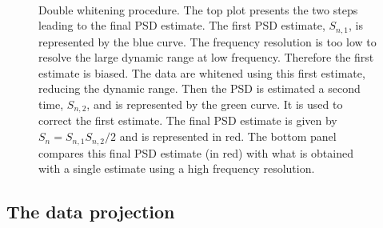 \begin{figure}
  \center
   \\
  \caption{Double whitening procedure. The top plot presents the two steps leading to the final PSD estimate. The first PSD estimate, $S_{n,1}$, is represented by the blue curve. The frequency resolution is too low to resolve the large dynamic range at low frequency. Therefore the first estimate is biased. The data are whitened using this first estimate, reducing the dynamic range. Then the PSD is estimated a second time, $S_{n,2}$, and is represented by the green curve. It is used to correct the first estimate. The final PSD estimate is given by $S_n=S_{n,1}S_{n,2}/2$ and is represented in red. The bottom panel compares this final PSD estimate (in red) with what is obtained with a single estimate using a high frequency resolution.}
  \label{fig:doublewhite}
\end{figure}



\subsection{The data projection} \label{sec:algorithm:projection}

